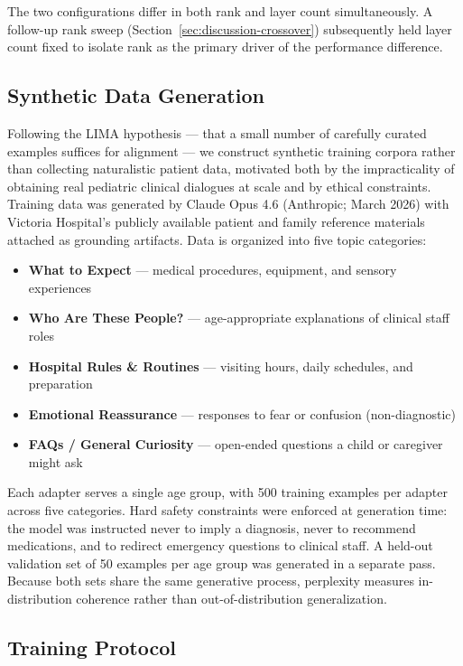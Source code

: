 \documentclass[journal]{IEEEtai}
\begin{document}
The two configurations differ in both rank and layer count simultaneously. A follow-up rank sweep (Section~\ref{sec:discussion-crossover}) subsequently held layer count fixed to isolate rank as the primary driver of the performance difference.

\subsection{Synthetic Data Generation}

Following the LIMA hypothesis \cite{zhou2023lima} --- that a small number of carefully curated examples suffices for alignment --- we construct synthetic training corpora rather than collecting naturalistic patient data, motivated both by the impracticality of obtaining real pediatric clinical dialogues at scale and by ethical constraints. Training data was generated by Claude Opus 4.6 (Anthropic; March 2026) with Victoria Hospital's publicly available patient and family reference materials attached as grounding artifacts. Data is organized into five topic categories:

\begin{itemize}
    \item \textbf{What to Expect} --- medical procedures, equipment, and sensory experiences
    \item \textbf{Who Are These People?} --- age-appropriate explanations of clinical staff roles
    \item \textbf{Hospital Rules \& Routines} --- visiting hours, daily schedules, and preparation
    \item \textbf{Emotional Reassurance} --- responses to fear or confusion (non-diagnostic)
    \item \textbf{FAQs / General Curiosity} --- open-ended questions a child or caregiver might ask
\end{itemize}

Each adapter serves a single age group, with 500 training examples per adapter across five categories. Hard safety constraints were enforced at generation time: the model was instructed never to imply a diagnosis, never to recommend medications, and to redirect emergency questions to clinical staff. A held-out validation set of 50 examples per age group was generated in a separate pass. Because both sets share the same generative process, perplexity measures in-distribution coherence rather than out-of-distribution generalization.

\subsection{Training Protocol}
\end{document}
